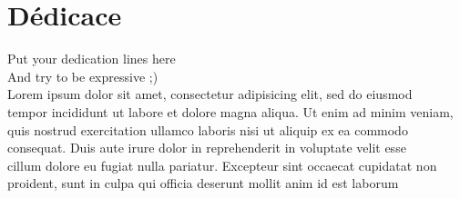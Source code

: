 \documentclass[a4paper, oneside, frenchb]{report}
\begin{document}
%



\chapter*{D\'edicace}
\thispagestyle{empty}
%

\begin{center}
  Put your dedication lines here ~\\
  And try to be expressive ;) ~\\


  Lorem ipsum dolor sit amet, consectetur adipisicing elit, sed do eiusmod ~\\
  tempor incididunt ut labore et dolore magna aliqua. Ut enim ad minim veniam, ~\\
  quis nostrud exercitation ullamco laboris nisi ut aliquip ex ea commodo ~\\
  consequat. Duis aute irure dolor in reprehenderit in voluptate velit esse ~\\
  cillum dolore eu fugiat nulla pariatur. Excepteur sint occaecat cupidatat non ~\\
  proident, sunt in culpa qui officia deserunt mollit anim id est laborum ~\\
\end{center}
%
\end{document}
